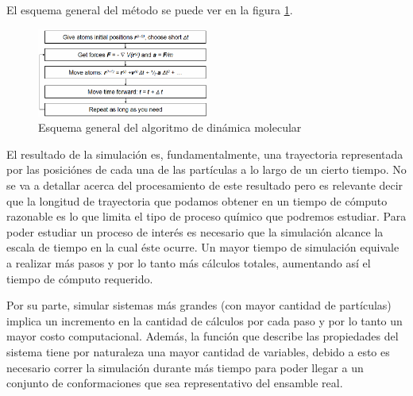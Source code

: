\documentclass[a4paper,10pt]{report}
\begin{document}
El esquema general del método se puede ver en la figura \ref{esquemaMD}.


\begin{figure}[!ht]
\begin{center}
\includegraphics[keepaspectratio, width=0.5\textwidth]{img/mdalgorithm.png}
\end{center}
\caption{Esquema general del algoritmo de dinámica molecular}
\label{esquemaMD}
\end{figure}







El resultado de la simulación es, fundamentalmente, una trayectoria representada por las posiciónes de cada una de las partículas a lo largo de un cierto tiempo.
No se va a detallar acerca del procesamiento de este resultado pero es relevante decir que la longitud de trayectoria que podamos obtener en un tiempo de cómputo razonable es lo que limita el tipo de proceso químico que podremos estudiar.
Para poder estudiar un proceso de interés es necesario que la simulación alcance la escala de tiempo en la cual éste ocurre. Un mayor tiempo de simulación equivale a realizar más pasos y por lo tanto más cálculos totales, aumentando así el tiempo de cómputo requerido.

Por su parte, simular sistemas más grandes (con mayor cantidad de partículas) implica un incremento en la cantidad de cálculos por cada paso y por lo tanto un mayor costo computacional. Además, la función que describe las propiedades del sistema tiene por naturaleza una mayor cantidad de variables, debido a esto es necesario correr la simulación durante más tiempo para poder llegar a un conjunto de conformaciones que sea representativo del ensamble real.
\end{document}
